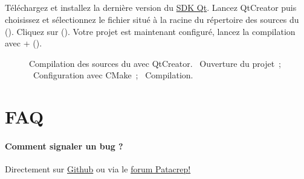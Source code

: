 \subsection{\windows}

Téléchargez et installez la dernière version du
\href{http://qt.nokia.com/downloads}{SDK Qt}. Lancez QtCreator puis
choisissez  et sélectionnez
le fichier  situé à la racine du répertoire des
sources du \client (). Cliquez sur
 (). Votre projet \client
est maintenant configuré, lancez la compilation avec
+ ().

\begin{figure}
  \centering
  \hspace{0.1cm}%
  \hspace{0.1cm}%
  \caption{%
    Compilation des sources du \recueil avec QtCreator.
    ~Ouverture du projet~;%
    ~Configuration avec CMake~;%
    ~Compilation.%
  }%
  \label{fig:qtcreator}
\end{figure}


\section{FAQ}

\paragraph{Comment signaler un bug ?}
Directement sur \href{http://github.com/crep4ever/songbook-client/issues}{Github}
ou via le \href{http://www.patacrep.com/forum/}{forum Patacrep!}

